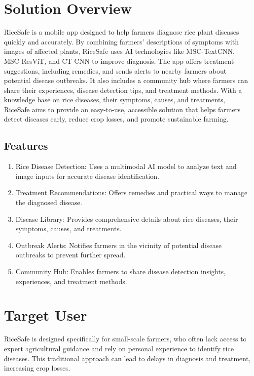 \section{Solution Overview}
\label{section:solution-overview}

RiceSafe is a mobile app designed to help farmers diagnose rice plant diseases quickly and accurately. By combining farmers’ descriptions of symptoms with images of affected plants, RiceSafe uses AI technologies like MSC-TextCNN, MSC-ResViT, and CT-CNN to improve diagnosis. The app offers treatment suggestions, including remedies, and sends alerts to nearby farmers about potential disease outbreaks. It also includes a community hub where farmers can share their experiences, disease detection tips, and treatment methods. With a knowledge base on rice diseases, their symptoms, causes, and treatments, RiceSafe aims to provide an easy-to-use, accessible solution that helps farmers detect diseases early, reduce crop losses, and promote sustainable farming.

\subsection{Features}
\label{subsection:features}

\begin{enumerate}[leftmargin=80pt]
    \item Rice Disease Detection: Uses a multimodal AI model to analyze text and image inputs for accurate disease identification.
    \item Treatment Recommendations: Offers remedies and practical ways to manage the diagnosed disease.
    \item Disease Library: Provides comprehensive details about rice diseases, their symptoms, causes, and treatments.
    \item Outbreak Alerts: Notifies farmers in the vicinity of potential disease outbreaks to prevent further spread.
    \item Community Hub: Enables farmers to share disease detection insights, experiences, and treatment methods.
\end{enumerate}

\section{Target User}
\label{section:target-user}

RiceSafe is designed specifically for small-scale farmers, who often lack access to expert agricultural guidance and rely on personal experience to identify rice diseases. This traditional approach can lead to delays in diagnosis and treatment, increasing crop losses.

